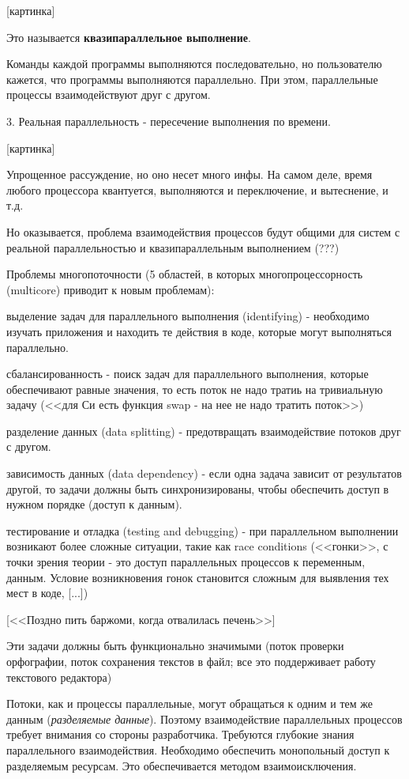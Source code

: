 \documentclass[a4paper, 12pt]{report}
\begin{document}
	[картинка]
	
	Это называется {\bf квазипараллельное выполнение}.
	
	Команды каждой программы выполняются последовательно, но пользователю кажется, что программы выполняются параллельно. При этом, параллельные процессы взаимодействуют друг с другом.
	
	3. Реальная параллельность - пересечение выполнения по времени.
	
	[картинка]
	
	Упрощенное рассуждение, но оно несет много инфы. На самом деле, время любого процессора квантуется, выполняются и переключение, и вытеснение, и т.д.
	
	Но оказывается, проблема взаимодействия процессов будут общими для систем с реальной параллельностью и квазипараллельным выполнением (???)
	
	Проблемы многопоточности (5 областей, в которых многопроцессорность (multicore) приводит к новым проблемам):
	
	выделение задач для параллельного выполнения (identifying) - необходимо изучать приложения и находить те действия в коде, которые могут выполняться параллельно.
	
	сбалансированность - поиск задач для параллельного выполнения, которые обеспечивают равные значения, то есть поток не надо тратиь на тривиальную задачу (<<для Си есть функция swap - на нее не надо тратить поток>>)
	
	разделение данных (data splitting) - предотвращать взаимодействие потоков друг с другом.
	
	зависимость данных (data dependency) - если одна задача зависит от результатов другой, то задачи должны быть синхронизированы, чтобы обеспечить доступ в нужном порядке (доступ к данным).
	
	тестирование и отладка (testing and debugging) - при параллельном выполнении возникают более сложные ситуации, такие как race conditions (<<гонки>>, с точки зрения теории - это доступ параллельных процессов к переменным, данным. Условие возникновения гонок становится сложным для выявления тех мест в коде, [...])
	
	[<<Поздно пить баржоми, когда отвалилась печень>>]
	
	Эти задачи должны быть функционально значимыми (поток проверки орфографии, поток сохранения текстов в файл; все это поддерживает работу текстового редактора)
	
	Потоки, как и процессы параллельные, могут обращаться к одним и тем же данным ({\it разделяемые данные}). Поэтому взаимодействие параллельных процессов требует внимания со стороны разработчика. Требуются глубокие знания параллельного взаимодействия. Необходимо обеспечить монопольный доступ к разделяемым ресурсам. Это обеспечивается методом взаимоисключения.
	
\end{document}
